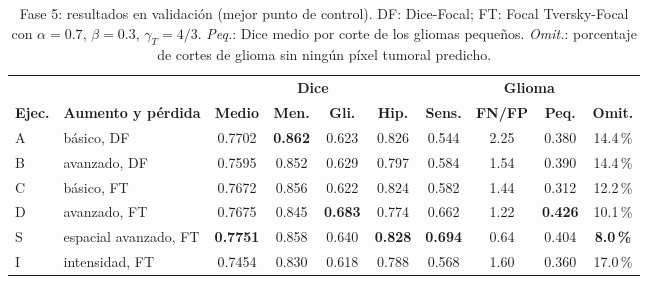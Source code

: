 \begin{table}[htbp]
  \centering
  \caption{Fase 5: resultados en validación (mejor punto de control). DF: Dice-Focal; FT: Focal Tversky-Focal con $\alpha=0.7$, $\beta=0.3$, $\gamma_T=4/3$. \emph{Peq.}: Dice medio por corte de los gliomas pequeños. \emph{Omit.}: porcentaje de cortes de glioma sin ningún píxel tumoral predicho.}
  \label{tab:fase5}
  \small
  \setlength{\tabcolsep}{3.4pt}
  \begin{tabular}{llcccccccc}
    \toprule
    & & \multicolumn{4}{c}{\textbf{Dice}} & \multicolumn{4}{c}{\textbf{Glioma}} \\
    \cmidrule(lr){3-6}\cmidrule(lr){7-10}
    \textbf{Ejec.} & \textbf{Aumento y pérdida} & \textbf{Medio} & \textbf{Men.} & \textbf{Gli.} & \textbf{Hip.} & \textbf{Sens.} & \textbf{FN/FP} & \textbf{Peq.} & \textbf{Omit.} \\
    \midrule
    A & básico, DF            & 0.7702 & \textbf{0.862} & 0.623 & 0.826 & 0.544 & 2.25 & 0.380 & 14.4\,\% \\
    B & avanzado, DF          & 0.7595 & 0.852 & 0.629 & 0.797 & 0.584 & 1.54 & 0.390 & 14.4\,\% \\
    C & básico, FT            & 0.7672 & 0.856 & 0.622 & 0.824 & 0.582 & 1.44 & 0.312 & 12.2\,\% \\
    D & avanzado, FT          & 0.7675 & 0.845 & \textbf{0.683} & 0.774 & 0.662 & 1.22 & \textbf{0.426} & 10.1\,\% \\
    \midrule
    S & espacial avanzado, FT & \textbf{0.7751} & 0.858 & 0.640 & \textbf{0.828} & \textbf{0.694} & 0.64 & 0.404 & \textbf{8.0\,\%} \\
    I & intensidad, FT        & 0.7454 & 0.830 & 0.618 & 0.788 & 0.568 & 1.60 & 0.360 & 17.0\,\% \\
    \bottomrule
  \end{tabular}
\end{table}

